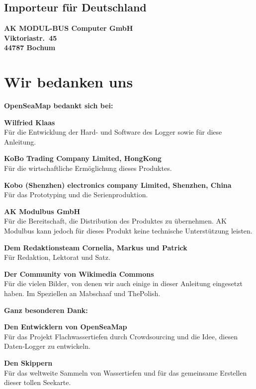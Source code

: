 \documentclass[pdftex, fontsize=8pt, paper=130mm:92mm,pagesize]{scrartcl}
\let\stdsection\section
\renewcommand\section{\newpage\stdsection}
\begin{document}


\subsection{Importeur für Deutschland}
\textbf{AK MODUL-BUS Computer GmbH\\
Viktoriastr.\ 45\\
44787 Bochum }

\section{Wir bedanken uns}

\textbf{OpenSeaMap bedankt sich bei:}

\textbf{Wilfried Klaas}\\
Für die Entwicklung der Hard- und Software des Logger sowie für diese Anleitung.

\textbf{KoBo Trading Company Limited, HongKong}\\
Für die wirtschaftliche Ermöglichung dieses Produktes.

\textbf{Kobo (Shenzhen) electronics company Limited, Shenzhen, China}\\
Für das Prototyping und die Serienproduktion.

\textbf{AK Modulbus GmbH}\\
Für die Bereitschaft, die Distribution des Produktes zu übernehmen. AK Modulbus kann jedoch für dieses Produkt keine technische Unterstützung leisten.

\textbf{Dem Redaktionsteam Cornelia, Markus und Patrick}\\
Für Redaktion, Lektorat und Satz.
\newpage

\textbf{Der Community von Wikimedia Commons}\\
Für die vielen Bilder, von denen wir auch einige in dieser Anleitung eingesetzt haben. Im Speziellen an Mabschaaf und ThePolish.

\vspace{2.5cm}

\textbf{Ganz besonderen Dank:}

\textbf{Den Entwicklern von OpenSeaMap}\\
Für das Projekt \glqq Flachwassertiefen durch Crowdsourcing\grqq{} und die Idee, diesen Daten-Logger zu entwickeln.

\textbf{Den Skippern}\\
Für das weltweite Sammeln von Wassertiefen und für das gemeinsame Erstellen dieser tollen Seekarte.

\newpage
\thispagestyle{empty}
\hspace{1cm} 
\newpage
\thispagestyle{empty}
\hspace{1cm} 
\end{document}
